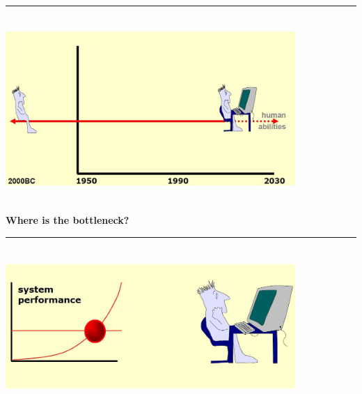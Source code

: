 \documentclass[pdf]{beamer}
\begin{document}
{{{\begin{frame}
\textcolor{red}{\rule{10cm}{1mm}}
\includegraphics[width=110mm, height=70mm, left]{5_psychology.JPG} \par
\vspace{5mm}
\fontsize{0.5pt}{1pt}\selectfont{ \textcolor{lightgray}
{Slide idea by Bill Buxton}}
\vspace*{-4mm}
\begin{flushright}
\fontsize{0.5pt}{1pt}\selectfont{ \textcolor{lightgray}
{Saul Greenberg}}
\end{flushright}
\end{frame}



{
\begin{frame}
\vspace{8mm}
\textcolor{myBlue}{\textbf{\Large{Where is the bottleneck?}}}

\textcolor{red}{\rule{10cm}{1mm}}
\includegraphics[width=110mm, height=60mm, left]{6_bottleneck.JPG} \par
\vspace{15mm}
\fontsize{0.5pt}{1pt}\selectfont{ \textcolor{lightgray}
{Slide idea by Bill Buxton}}

\vspace*{-4mm}
\begin{flushright}
\fontsize{0.5pt}{1pt}\selectfont{ \textcolor{lightgray}
{Saul Greenberg}}
\end{flushright}
\end{frame}



}}}}
\end{document}
